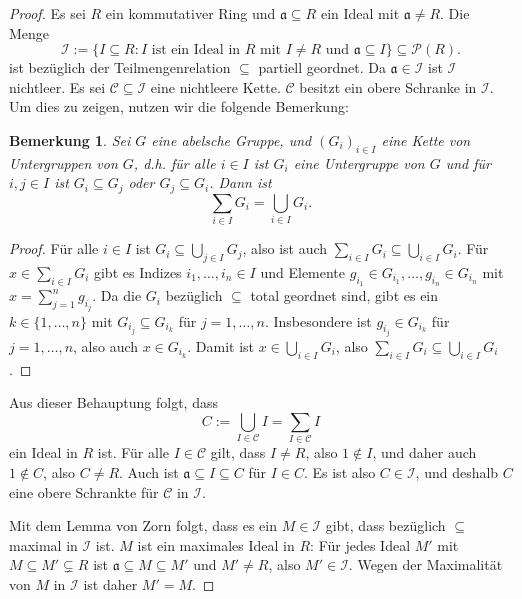 \documentclass[a4paper,10pt]{article}
\newcounter{satze}
\newtheorem{bem}[satze]{Bemerkung}
\newcommand{\mf}[1]{\mathfrak{#1}}
\newcommand{\mc}[1]{\mathcal{#1}}
\begin{document}
\begin{proof}
Es sei $R$ ein kommutativer Ring und $\mf{a} \subseteq R$ ein Ideal mit $\mf{a} \neq R$. Die Menge
\[
 \mc{I} := \{I \subseteq R : I \text{ ist ein Ideal in $R$ mit $I \neq R$ und $\mf{a} \subseteq I$} \} \subseteq \mc{P}(R).
\]
ist bezüglich der Teilmengenrelation $\subseteq$ partiell geordnet. Da $\mf{a} \in \mc{I}$ ist $\mc{I}$ nichtleer. Es sei $\mc{C} \subseteq \mc{I}$ eine nichtleere Kette. $\mc{C}$ besitzt ein obere Schranke in $\mc{I}$. Um dies zu zeigen, nutzen wir die folgende Bemerkung:

\begin{bem}
 Sei $G$ eine abelsche Gruppe, und $(G_i)_{i \in I}$ eine Kette von Untergruppen von $G$, d.h. für alle $i \in I$ ist $G_i$ eine Untergruppe von $G$ und für $i,j \in I$ ist $G_i \subseteq G_j$ oder $G_j \subseteq G_i$. Dann ist
 \[
  \sum_{i \in I} G_i = \bigcup_{i \in I} G_i.
 \]
\end{bem}
\begin{proof}
 Für alle $i \in I$ ist $G_i \subseteq \bigcup_{j \in I} G_j$, also ist auch $\sum_{i \in I} G_i \subseteq \bigcup_{i \in I} G_i$. Für $x \in \sum_{i \in I} G_i$ gibt es Indizes $i_1, \ldots, i_n \in I$ und Elemente $g_{i_1} \in G_{i_1}, \ldots, g_{i_n} \in G_{i_n}$ mit $x = \sum_{j=1}^n g_{i_j}$. Da die $G_i$ bezüglich $\subseteq$ total geordnet sind, gibt es ein $k \in \{1, \ldots, n\}$ mit $G_{i_j} \subseteq G_{i_k}$ für $j=1,\ldots,n$. Insbesondere ist $g_{i_j} \in G_{i_k}$ für $j=1,\ldots,n$, also auch $x \in G_{i_k}$. Damit ist $x \in \bigcup_{i \in I} G_i$, also $\sum_{i \in I} G_i \subseteq \bigcup_{i \in I} G_i$.
\end{proof}

Aus dieser Behauptung folgt, dass
\[
 C := \bigcup_{I \in \mc{C}} I = \sum_{I \in \mc{C}} I
\]
ein Ideal in $R$ ist.
Für alle $I \in \mc{C}$ gilt, dass $I \neq R$, also $1 \not\in I$, und daher auch $1 \not\in C$, also $C \neq R$. Auch ist $\mf{a} \subseteq I \subseteq C$ für $I \in C$. Es ist also $C \in \mc{I}$, und deshalb $C$ eine obere Schrankte für $\mc{C}$ in $\mc{I}$.

Mit dem Lemma von Zorn folgt, dass es ein $M \in \mc{I}$ gibt, dass bezüglich $\subseteq$ maximal in $\mc{I}$ ist. $M$ ist ein maximales Ideal in $R$: Für jedes Ideal $M'$ mit $M \subseteq M' \subsetneq R$ ist $\mf{a} \subseteq M \subseteq M'$ und $M' \neq R$, also $M' \in \mc{I}$. Wegen der Maximalität von $M$ in $\mc{I}$ ist daher $M' = M$.
\end{proof}
\end{document}
